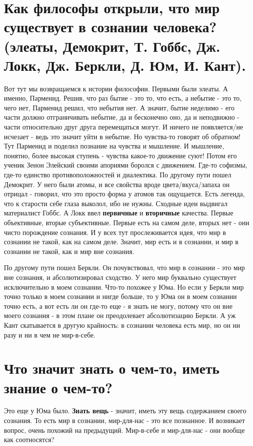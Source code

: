 \section{ Как философы открыли, что мир существует в сознании человека? (элеаты, Демокрит, Т. Гоббс, Дж. Локк, Дж. Беркли, Д. Юм, И. Кант).}
Вот тут мы возвращаемся к истории философии. Первыми были элеаты. А именно, Парменид. Решив, что раз бытие - это то, что есть, а небытие - это то, чего нет, Парменид решил, что небытия нет. А значит, бытие неделимо - его части должно отграничивать небытие, да и бесконечно оно, да и неподвижно - части относительно друг друга перемещаться могут. И ничего не появляется/не исчезает - ведь это значит уйти в небытие. Но чувства-то говорят об обратном! Тут Парменид и поделил познание на чувства и мышление. И мышление, понятно, более высокая ступень - чувства какое-то движение суют! Потом его ученик Зенон Элейский своими апориями боролся с движением. Где-то софизмы, где-то единство противоположностей и диалектика. По другому пути пошел Демокрит. У него были атомы, и все свойства вроде цвета/вкуса/запаха он отрицал - говорил, что это просто форма у атомов так ощущается. Есть легенда, что к старости себе глаза выколол, ибо не нужны. Сходные идеи выдвигал материалист Гоббс. А Локк ввел \textbf{первичные} и \textbf{вторичные} качества. Первые объективные, вторые субъективные. Первые есть на самом деле, вторых нет - они чисто порождение сознания. И у всех тут прослеживается идея, что мир в сознании не такой, как на самом деле. Значит, мир есть и в сознании, и мир в сознании не такой, как и мир вне сознания. 

По другому пути пошел Беркли. Он почувствовал, что мир в сознании - это мир вне сознания, и абсолютизировал сходство. У него мир буквально существует исключительно в моем сознании. Что-то похожее у Юма. Но если у Беркли мир точно только в моем сознании и нигде больше, то у Юма он в моем сознании точно есть, а вот есть ли он где-то еще - я знать не могу, потому что он вне моего сознания - в этом плане он преодолевает абсолютизацию Беркли. А уж Кант скатывается в другую крайность: в сознании человека есть мир, но он ни разу и ни в чем не мир-в-себе.

\section{ Что значит знать о чем-то, иметь знание о чем-то?}
Это еще у Юма было. \textbf{Знать вещь} - значит, иметь эту вещь содержанием своего сознания. То есть мир в сознании, мир-для-нас - это все познанное. И возникает вопрос, очень похожий на предыдущий. Мир-в-себе и мир-для-нас - они вообще как соотносятся?

